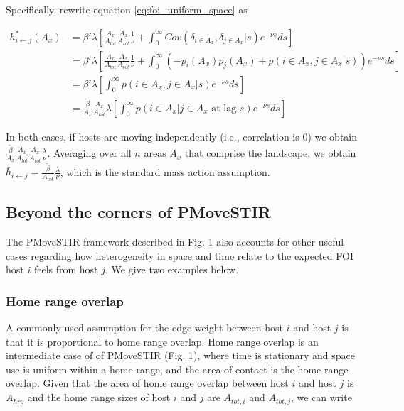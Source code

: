 \documentclass[letterpaper]{article}
\begin{document}
Specifically, rewrite equation \ref{eq:foi_uniform_space} as 

\begin{equation}
    \begin{aligned}
        h^*_{i \leftarrow j}(A_x) &= \beta' \lambda [\frac{A_x}{A_{tot}}\frac{A_x}{A_{tot}} \frac{1}{\nu} + \int_{0}^{\infty} Cov(\delta_{i \in A_x}, \delta_{j \in A_x} | s) e^{-\nu s} ds] \\
        &= \beta' \lambda [\frac{A_x}{A_{tot}}\frac{A_x}{A_{tot}} \frac{1}{\nu} + \int_{0}^{\infty} ( - p_i(A_x)p_j(A_x) + p(i \in A_x, j \in A_x | s)) e^{-\nu s} ds] \\
        &= \beta' \lambda [\int_{0}^{\infty} p(i \in A_x, j \in A_x | s) e^{-\nu s} ds] \\
        &= \frac{\tilde{\beta}}{A_x} \frac{A_x}{A_{tot}} \lambda [\int_{0}^{\infty} p(i \in A_x | j \in A_x \text{ at lag } s) e^{-\nu s} ds]
    \end{aligned}
    \label{eq:uniform_stationary2}
\end{equation}

In both cases, if hosts are moving independently (i.e., correlation is 0) we obtain $\frac{\tilde{\beta}}{A_x} \frac{A_x}{A_{tot}} \frac{A_x}{A_{tot}}  \frac{\lambda}{\nu}$. Averaging over all $n$ areas $A_x$ that comprise the landscape, we obtain $\bar{h}_{i \leftarrow j} =\frac{\tilde{\beta}}{A_\text{tot}} \frac{\lambda}{\nu}$, which is the standard mass action assumption.

\subsection*{Beyond the corners of PMoveSTIR}

The PMoveSTIR framework described in Fig. 1 also accounts for other useful cases regarding how heterogeneity in space and time relate to the expected FOI host $i$ feels from host $j$.  We give two examples below.

\subsubsection*{Home range overlap}

A commonly used assumption for the edge weight between host $i$ and host $j$ is that it is proportional to home range overlap.  Home range overlap is an intermediate case of of PMoveSTIR (Fig. 1), where time is stationary and space use is uniform within a home range, and the area of contact is the home range overlap.  Given that the area of home range overlap between host $i$ and host $j$ is $A_{hro}$ and the home range sizes of host $i$ and $j$ are $A_{tot, i}$ and $A_{tot, j}$, we can write
\end{document}
